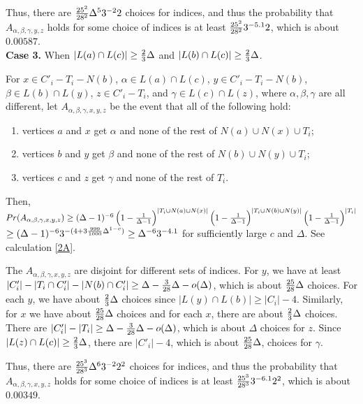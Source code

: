 \documentclass[12pt]{article}
\theoremstyle{definition}
\begin{document}
Thus, there are ${25^2\over 28^2}\Delta^5 3^{-2}2$ choices for indices, and thus the probability that $A_{\alpha, \beta, \gamma, y, z}$ holds for some choice of indices is at least ${25^2\over 28^2}3^{-5.1}2$, which is about $0.00587$. \\

{\bf Case 3.} When $|L(a)\cap L(c)|\geq {2\over 3}\Delta$ and $|L(b)\cap L(c)|\geq{2\over 3}\Delta$.

For $x\in C'_i-T_i-N(b)$, $\alpha\in L(a)\cap L(c)$, $y\in C'_i-T_i-N(b)$, $\beta\in L(b)\cap L(y)$, $z\in C'_i-T_i$, and $\gamma\in L(c)\cap L(z)$, where $\alpha, \beta, \gamma$ are all different, let $A_{\alpha, \beta, \gamma, x, y, z}$ be the event that all of the following hold:

\begin{enumerate}[$(i)$]
\item vertices $a$ and $x$ get $\alpha$ and none of the rest of $N(a)\cup N(x)\cup T_i$;
\item vertices $b$ and $y$ get $\beta$ and none of the rest of $N(b)\cup N(y) \cup T_i$;
\item vertices $c$ and $z$ get $\gamma$ and none of the rest of $T_i$.
\end{enumerate} 

Then, $Pr(A_{\alpha, \beta, \gamma, x, y, z})\geq (\Delta-1)^{-6}\left(1-{1\over \Delta-1}\right)^{|T_i\cup N(a)\cup N(x)|}\left(1-{1\over \Delta-1}\right)^{|T_i\cup N(b)\cup N(y)|}\left(1-{1\over \Delta-1}\right)^{|T_i|}$
$\geq (\Delta-1)^{-6}3^{-(4+3{999\over 1 000}\Delta^{1-c})}\geq \Delta^{-6} 3^{-4.1}$ for sufficiently large $c$ and $\Delta$. See calculation \ref{2A}.

The $A_{\alpha, \beta, \gamma, x, y, z}$ are disjoint for different sets of indices. 
For $y$, we have at least $|C'_i|-|T_i\cap C'_i|-|N(b)\cap C'_i|\geq \Delta-{3\over 28}\Delta-o(\Delta)$, which is about ${25\over 28}\Delta$ choices. 
For each $y$, we have about ${2\over 3}\Delta$ choices since $|L(y)\cap L(b)|\geq |C_i|-4$. 
Similarly, for $x$ we have about ${25\over 28}\Delta$ choices and for each $x$, there are about ${2\over 3}\Delta$ choices. 
There are $|C'_i|-|T_i|\geq \Delta-{3\over 28}\Delta-o(\Delta)$, which is about $\Delta$ choices for $z$. Since $|L(z)\cap L(c)|\geq {2\over 3}\Delta$, there are $|C'_i|-4$, which is about ${25\over 28}\Delta$, choices for $\gamma$. 

Thus, there are ${25^3\over 28^3}\Delta^6 3^{-2}2^2$ choices for indices, and thus the probability that $A_{\alpha, \beta, \gamma, x, y, z}$ holds for some choice of indices is at least ${25^3\over 28^3}3^{-6.1}2^2$, which is about $0.00349$. 
\end{document}
